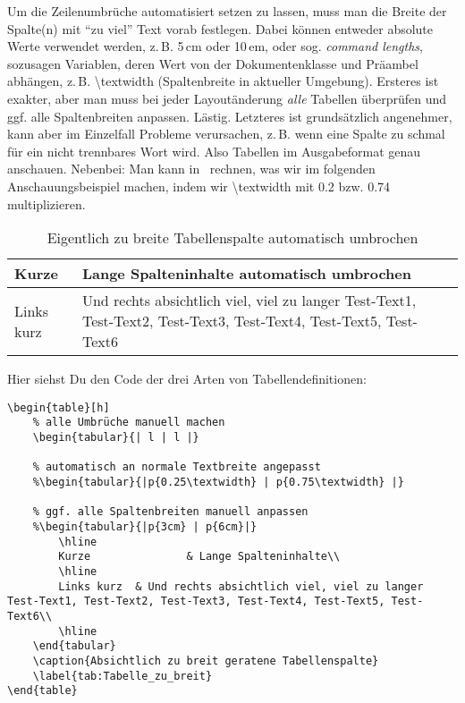 Um die Zeilenumbrüche automatisiert setzen zu lassen, muss man die Breite der Spalte(n) mit \enquote{zu viel} Text vorab festlegen. Dabei können entweder absolute Werte verwendet werden, z.\,B. 5\,cm oder 10\,em, oder sog. \textit{command lengths}, sozusagen Variablen, deren Wert von der Dokumentenklasse und Präambel abhängen, z.\,B. \textbackslash textwidth (Spaltenbreite in aktueller Umgebung). Ersteres ist exakter, aber man muss bei jeder Layoutänderung \textit{alle} Tabellen überprüfen und ggf. alle Spaltenbreiten anpassen. Lästig. Letzteres ist grundsätzlich angenehmer, kann aber im Einzelfall Probleme verursachen, z.\,B. wenn eine Spalte zu schmal für ein nicht trennbares Wort wird. Also Tabellen im Ausgabeformat genau anschauen. Nebenbei: Man kann in \DMLLaTeX \ rechnen, was wir im folgenden Anschauungsbeispiel machen, indem wir \textbackslash textwidth mit 0.2 bzw. 0.74 multiplizieren.

\begin{table}[h]		
		\begin{tabular}{|p{} | p{} |}  
			\hline
			Kurze				& Lange Spalteninhalte automatisch umbrochen\\
			\hline
			Links kurz	&Und rechts absichtlich viel, viel zu langer Test-Text1, Test-Text2, Test-Text3, Test-Text4, Test-Text5, Test-Text6\\
			\hline
		\end{tabular}
	\caption{Eigentlich zu breite Tabellenspalte automatisch umbrochen}
	\label{tab:Tabelle_zu_breit_automatisch}
\end{table}

Hier siehst Du den Code der drei Arten von Tabellendefinitionen:

\begin{lstlisting}
\begin{table}[h]	
	% alle Umbrüche manuell machen
	\begin{tabular}{| l | l |}

	% automatisch an normale Textbreite angepasst
	%\begin{tabular}{|p{0.25\textwidth} | p{0.75\textwidth} |} 

	% ggf. alle Spaltenbreiten manuell anpassen	  
	%\begin{tabular}{|p{3cm} | p{6cm}|} 
		\hline
		Kurze				& Lange Spalteninhalte\\
		\hline
		Links kurz	& Und rechts absichtlich viel, viel zu langer Test-Text1, Test-Text2, Test-Text3, Test-Text4, Test-Text5, Test-Text6\\
		\hline			
	\end{tabular}
	\caption{Absichtlich zu breit geratene Tabellenspalte}
	\label{tab:Tabelle_zu_breit}
\end{table}
\end{lstlisting}

